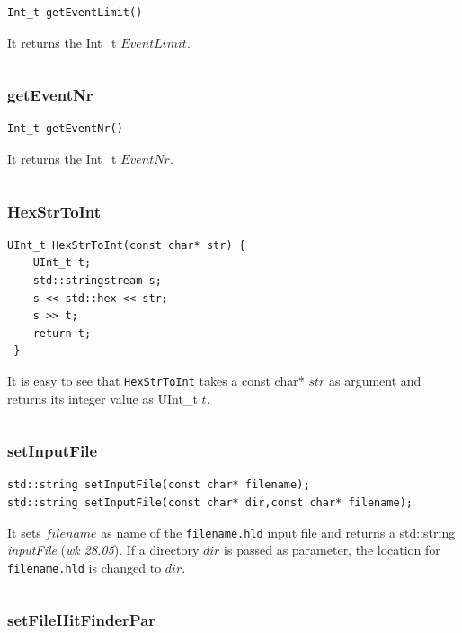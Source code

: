 \documentclass[a4paper]{book}
\begin{document}
\begin{lstlisting}
Int_t getEventLimit()
\end{lstlisting}

It returns the Int\_t $EventLimit$.

\[\]

\subsubsection{getEventNr}

\begin{lstlisting}
Int_t getEventNr()
\end{lstlisting}

It returns the Int\_t $EventNr$.

\[\]

\subsubsection{HexStrToInt}

\begin{lstlisting}
UInt_t HexStrToInt(const char* str) {
	UInt_t t;
	std::stringstream s;
	s << std::hex << str;
	s >> t;
	return t;
 }
\end{lstlisting}

It is easy to see that \texttt{HexStrToInt} takes a const char* $str$ as argument and returns its integer value as UInt\_t $t$.

\[\]

\subsubsection{setInputFile}

\begin{lstlisting}
std::string setInputFile(const char* filename);
std::string setInputFile(const char* dir,const char* filename); 
\end{lstlisting}

It sets $filename$ as name of the \texttt{filename.hld} input file and returns a std::string \textit{inputFile} (\textit{wk 28.05}). If a directory $dir$ is passed as parameter, the location for \texttt{filename.hld} is changed to $dir$.

\[\]

\subsubsection{setFileHitFinderPar}
\end{document}
